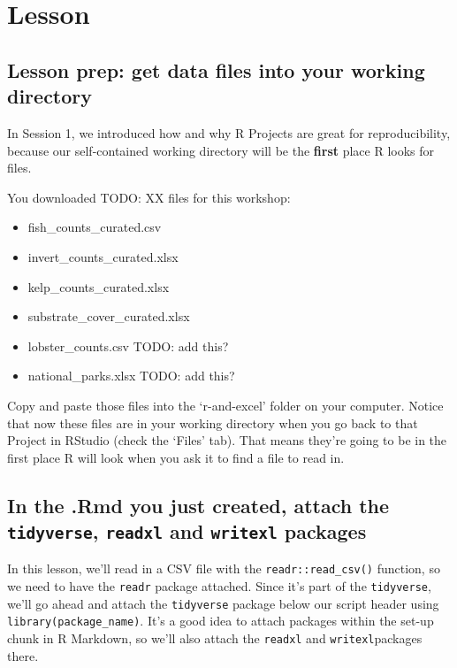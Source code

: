 \documentclass[]{book}
\providecommand{\tightlist}{%
  \setlength{\itemsep}{0pt}\setlength{\parskip}{0pt}}
\begin{document}
\hypertarget{lesson}{%
\section{Lesson}\label{lesson}}

\hypertarget{lesson-prep-get-data-files-into-your-working-directory}{%
\subsection{Lesson prep: get data files into your working directory}\label{lesson-prep-get-data-files-into-your-working-directory}}

In Session 1, we introduced how and why R Projects are great for reproducibility, because our self-contained working directory will be the \textbf{first} place R looks for files.

You downloaded TODO: XX files for this workshop:

\begin{itemize}
\tightlist
\item
  fish\_counts\_curated.csv
\item
  invert\_counts\_curated.xlsx
\item
  kelp\_counts\_curated.xlsx
\item
  substrate\_cover\_curated.xlsx
\item
  lobster\_counts.csv TODO: add this?
\item
  national\_parks.xlsx TODO: add this?
\end{itemize}

Copy and paste those files into the `r-and-excel' folder on your computer. Notice that now these files are in your working directory when you go back to that Project in RStudio (check the `Files' tab). That means they're going to be in the first place R will look when you ask it to find a file to read in.

\hypertarget{in-the-.rmd-you-just-created-attach-the-tidyverse-readxl-and-writexl-packages}{%
\subsection{\texorpdfstring{In the .Rmd you just created, attach the \texttt{tidyverse}, \texttt{readxl} and \texttt{writexl} packages}{In the .Rmd you just created, attach the tidyverse, readxl and writexl packages}}\label{in-the-.rmd-you-just-created-attach-the-tidyverse-readxl-and-writexl-packages}}

In this lesson, we'll read in a CSV file with the \texttt{readr::read\_csv()} function, so we need to have the \texttt{readr} package attached. Since it's part of the \texttt{tidyverse}, we'll go ahead and attach the \texttt{tidyverse} package below our script header using \texttt{library(package\_name)}. It's a good idea to attach packages within the set-up chunk in R Markdown, so we'll also attach the \texttt{readxl} and \texttt{writexl}packages there.
\end{document}
